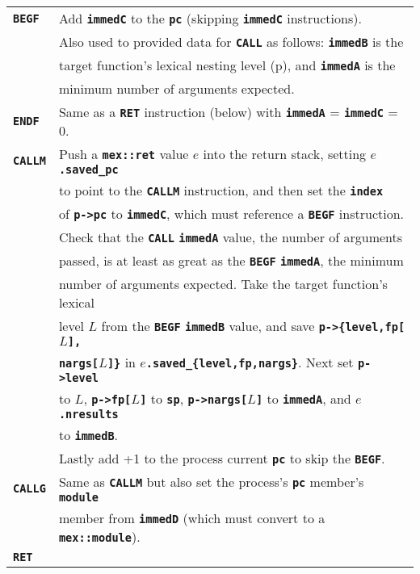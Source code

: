 \documentclass[12pt]{article}
\makeatletter
\newcommand{\TT}[1]{{\tt \bfseries #1}}
\newcommand{\ttkey}[1]{\TT{#1}\index{#1@{\tt #1}}}
\newcommand{\pagref}[1]{p\pageref{#1}}
\newlength{\figurewidth}
\newenvironment{boxedfigure}[1][!btp]%
	{\begin{figure*}[#1]
	 \begin{lrbox}{\figurebox}
	 \begin{minipage}{\figurewidth}

	 \vspace*{1ex}}%
	{
	 \vspace*{1ex}

	 \end{minipage}
	 \end{lrbox}

	 \centering
	 \fbox{\hspace*{0.1in}\usebox{\figurebox}\hspace*{0.1in}}
	 \end{figure*}}
\makeatother
\begin{document}
\begin{boxedfigure}

\begin{center}
\begin{tabular}{|l|l|}
\hline
\ttkey{BEGF}
    & Add \TT{immedC} to the \TT{pc} (skipping \TT{immedC} instructions).
    \\[0.5ex]
    & Also used to provided data for \TT{CALL} as follows: \TT{immedB} is the \\
    & target function's lexical nesting level (\pagref{LEXICAL-LEVEL}),
      and \TT{immedA} is the \\
    & minimum number of arguments expected.
\\\hline
\ttkey{ENDF}
    & Same as a \TT{RET} instruction (below) with
      \TT{immedA} = \TT{immedC} = 0. 
\\\hline
\ttkey{CALLM}
    & Push a \TT{mex::ret} value $e$ into the return stack, setting
      \TT{$e$.saved\_pc} \\
    & to point to the \TT{CALLM} instruction, and then
      set the \TT{index} \\
    & of \TT{p->pc} to \TT{immedC}, which must reference a
      \TT{BEGF} instruction.
    \\[0.5ex]
    & Check that the \TT{CALL} \TT{immedA} value, the number of arguments \\
    & passed, is at least as great as the \TT{BEGF}
      \TT{immedA}, the minimum \\
    & number of arguments expected.  Take the target 
      function's lexical \\
    & level $L$ from the \TT{BEGF} \TT{immedB} value, and save
      \TT{p->\{level,fp[$L$],} \\
    & \TT{nargs[$L$]\}} in \TT{$e$.saved\_\{level,fp,nargs\}}.
       Next set \TT{p->level} \\
    & to $L$, \TT{p->fp[$L$]} to \TT{sp}, \TT{p->nargs[$L$]} to \TT{immedA},
      and \TT{$e$.nresults} \\
    & to \TT{immedB}.
    \\[0.5ex]
    & Lastly add +1 to the process current \TT{pc} to skip the \TT{BEGF}.
\\\hline
\ttkey{CALLG}
    & Same as \TT{CALLM} but also set the process's \TT{pc} member's 
                                                           \TT{module} \\
    & member from \TT{immedD} (which must convert to a \TT{mex::module}).
\\\hline
\ttkey{RET}

\end{tabular}
\end{center}
\end{boxedfigure}
\end{document}
